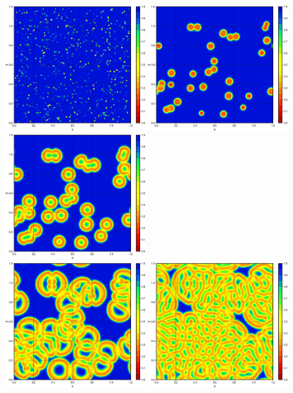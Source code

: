 \begin{center}
\includegraphics[width=5.2cm]{python_codes/fieldstone_171/images/uu000000.jpg}
\includegraphics[width=5.2cm]{python_codes/fieldstone_171/images/uu000001.jpg}
\includegraphics[width=5.2cm]{python_codes/fieldstone_171/images/uu000003.jpg}\\
\includegraphics[width=5.2cm]{python_codes/fieldstone_171/images/uu000007.jpg}
\includegraphics[width=5.2cm]{python_codes/fieldstone_171/images/uu000012.jpg}

\end{center}

